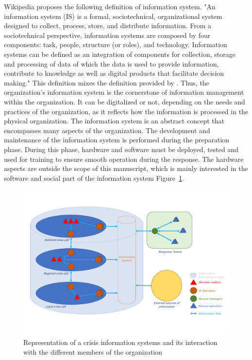 Wikipedia \cite{InformationSystem2021} proposes the following definition of information system.
"An information system (IS) is a formal, sociotechnical, organizational system designed to collect, process, store, and distribute information.
From a sociotechnical perspective, information systems are composed by four components: task, people, structure (or roles), and technology.
Information systems can be defined as an integration of components for collection, storage and processing of data of which the data is used
to provide information, contribute to knowledge as well as digital products that facilitate decision making."
This definition mixes the definition provided by \cite{oharaManagingThreeLevels1999,piccoliInformationSystemsManagers2019,zwassInformationSystemDefinition}.
Thus, the organization's information system is the cornerstone of information management within the organization.
It can be digitalized or not, depending on the needs and practices of the organization, as it reflects how the information is processed in the physical organization.
The information system is an abstract concept that encompasses many aspects of the organization.
The development and maintenance of the information system is performed during the preparation phase.
During this phase, hardware and software must be deployed, tested and used for training to ensure smooth operation during the response.
The hardware aspects are outside the scope of this manuscript, which is mainly interested in the software and social part of the information system Figure~\ref{context:information-system}.

\begin{figure}
    \centering
    \includegraphics[width=\textwidth]{figures/information-system.pdf}
    \caption{Representation of a crisis information systems and its interaction with the different members of the organization}
    \label{context:information-system}
\end{figure}

